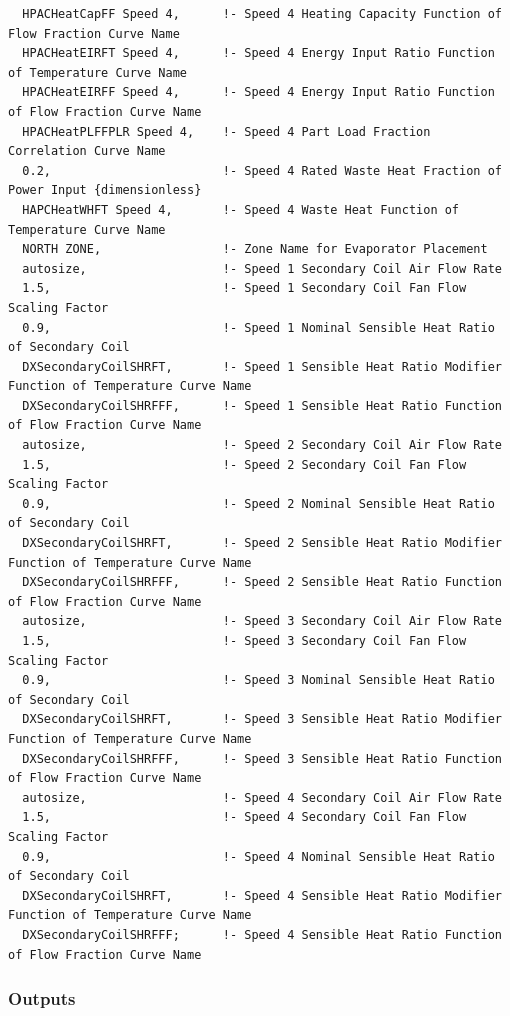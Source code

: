 \begin{lstlisting}
  HPACHeatCapFF Speed 4,      !- Speed 4 Heating Capacity Function of Flow Fraction Curve Name
  HPACHeatEIRFT Speed 4,      !- Speed 4 Energy Input Ratio Function of Temperature Curve Name
  HPACHeatEIRFF Speed 4,      !- Speed 4 Energy Input Ratio Function of Flow Fraction Curve Name
  HPACHeatPLFFPLR Speed 4,    !- Speed 4 Part Load Fraction Correlation Curve Name
  0.2,                        !- Speed 4 Rated Waste Heat Fraction of Power Input {dimensionless}
  HAPCHeatWHFT Speed 4,       !- Speed 4 Waste Heat Function of Temperature Curve Name
  NORTH ZONE,                 !- Zone Name for Evaporator Placement
  autosize,                   !- Speed 1 Secondary Coil Air Flow Rate
  1.5,                        !- Speed 1 Secondary Coil Fan Flow Scaling Factor
  0.9,                        !- Speed 1 Nominal Sensible Heat Ratio of Secondary Coil
  DXSecondaryCoilSHRFT,       !- Speed 1 Sensible Heat Ratio Modifier Function of Temperature Curve Name
  DXSecondaryCoilSHRFFF,      !- Speed 1 Sensible Heat Ratio Function of Flow Fraction Curve Name
  autosize,                   !- Speed 2 Secondary Coil Air Flow Rate
  1.5,                        !- Speed 2 Secondary Coil Fan Flow Scaling Factor
  0.9,                        !- Speed 2 Nominal Sensible Heat Ratio of Secondary Coil
  DXSecondaryCoilSHRFT,       !- Speed 2 Sensible Heat Ratio Modifier Function of Temperature Curve Name
  DXSecondaryCoilSHRFFF,      !- Speed 2 Sensible Heat Ratio Function of Flow Fraction Curve Name
  autosize,                   !- Speed 3 Secondary Coil Air Flow Rate
  1.5,                        !- Speed 3 Secondary Coil Fan Flow Scaling Factor
  0.9,                        !- Speed 3 Nominal Sensible Heat Ratio of Secondary Coil
  DXSecondaryCoilSHRFT,       !- Speed 3 Sensible Heat Ratio Modifier Function of Temperature Curve Name
  DXSecondaryCoilSHRFFF,      !- Speed 3 Sensible Heat Ratio Function of Flow Fraction Curve Name
  autosize,                   !- Speed 4 Secondary Coil Air Flow Rate
  1.5,                        !- Speed 4 Secondary Coil Fan Flow Scaling Factor
  0.9,                        !- Speed 4 Nominal Sensible Heat Ratio of Secondary Coil
  DXSecondaryCoilSHRFT,       !- Speed 4 Sensible Heat Ratio Modifier Function of Temperature Curve Name
  DXSecondaryCoilSHRFFF;      !- Speed 4 Sensible Heat Ratio Function of Flow Fraction Curve Name
\end{lstlisting}

\subsubsection{Outputs}\label{secondary-dx-coil-output}

